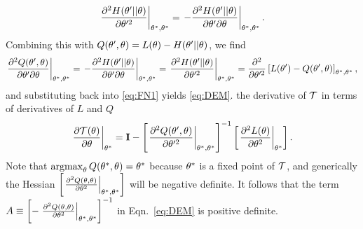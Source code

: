 {  \begin{equation*}
    \left. \frac{\partial^2 H(\parameters' || \parameters)}{\partial
        \parameters'^2} \right|_{\parameters^*,\parameters^*} %
    = \left.- \frac{\partial^2 H(\parameters' || \parameters)}{\partial
        \parameters' \partial \parameters} \right|_{\parameters^*,\parameters^*}.
  \end{equation*}
  Combining this with $Q(\theta',\theta) = L(\theta) -
  H(\theta' || \theta)$, we find
  \begin{equation*}
    \left. \frac{\partial^2 Q(\parameters',\parameters)}{\partial \parameters'
        \partial \parameters} \right|_{\parameters^*,\parameters^*} = %
    \left. - \frac{\partial^2 H(\parameters' || \parameters)}{\partial
        \parameters' \partial \parameters} \right|_{\parameters^*,\parameters^*} = %
    \left. \frac{\partial^2 H(\parameters' || \parameters)}{\partial
        \parameters'^2} \right|_{\parameters^*,\parameters^*} =%
    \frac{\partial^2}{\partial \parameters'^2} \left[ L(\parameters') -
      Q(\parameters',\parameters) \right]_{\parameters^*,\parameters^*},
  \end{equation*}
  and substituting back into \eqref{eq:FN1} yields \eqref{eq:DEM}.}
the derivative of $\EMmap$ in terms of derivatives of $L$ and $Q$
\begin{equation}
  \label{eq:DEM}
  \left. \frac{\partial \EMmap(\parameters)}{\partial \parameters}
  \right|_{\parameters^*} = \id -
  \left[ \left. \frac{\partial^2 Q(\parameters',\parameters)}{\partial
        \parameters'^2} \right|_{\parameters^*,\parameters^*} \right]^{-1}
  \left[ \left. \frac{\partial^2 L(\parameters)}{\partial
        \parameters^2} \right|_{\parameters^*} \right].
\end{equation}
Note that $\operatorname*{argmax}_\theta Q(\theta^*,\theta) =
\theta^*$ because $\theta^*$ is a fixed point of $\EMmap$,
and generically the Hessian $\left[ \left.  \frac{\partial^2
      Q(\theta,\theta)}{\partial \theta^2}
  \right|_{\theta^*,\theta^*} \right]$ will be negative
definite.  It follows that the term $A \equiv \left[ -\left.
    \frac{\partial^2 Q(\theta,\theta)}{\partial
      \theta^2} \right|_{\theta^*,\theta^*}
\right]^{-1}$ in Eqn.~\eqref{eq:DEM} is positive definite.


